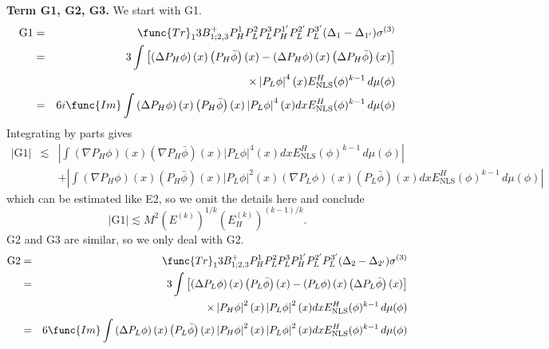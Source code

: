 \documentclass[12pt,letterpaper,leqno]{amsart}
\theoremstyle{plain}
\numberwithin{equation}{section}
\numberwithin{theorem}{section}
\numberwithin{proposition}{section}
\numberwithin{lemma}{section}
\numberwithin{corollary}{section}
\begin{document}
\textbf{Term G1, G2, G3. }We start with G1.%
\begin{eqnarray*}
\text{G1} &=&\func{Tr}%
_{1}3B_{1;2,3}^{+}P_{H}^{1}P_{L}^{2}P_{L}^{3}P_{H}^{1^{\prime
}}P_{L}^{2^{\prime }}P_{L}^{3^{\prime }}(\Delta _{1}-\Delta _{1^{\prime
}})\sigma ^{(3)} \\
&=&3\int \left[ \left( \Delta P_{H}\phi \right) (x)\left( P_{H}\bar{\phi}%
\right) (x)-\left( \Delta P_{H}\phi \right) (x)\left( \Delta P_{H}\bar{\phi}%
\right) (x)\right] \\
&&\times \left\vert P_{L}\phi \right\vert ^{4}(x)E_{\text{NLS}}^{H}(\phi
)^{k-1}\,d\mu (\phi ) \\
&=&6i\func{Im}\int \left( \Delta P_{H}\phi \right) (x)\left( P_{H}\bar{\phi}%
\right) (x)\left\vert P_{L}\phi \right\vert ^{4}(x)dxE_{\text{NLS}}^{H}(\phi
)^{k-1}\,d\mu (\phi )
\end{eqnarray*}%
Integrating by parts gives%
\begin{eqnarray*}
\left\vert \text{G1}\right\vert &\lesssim &\left\vert \int \left( \nabla
P_{H}\phi \right) (x)\left( \nabla P_{H}\bar{\phi}\right) (x)\left\vert
P_{L}\phi \right\vert ^{4}(x)dxE_{\text{NLS}}^{H}(\phi )^{k-1}\,d\mu (\phi
)\right\vert \\
&&+\left\vert \int \left( \nabla P_{H}\phi \right) (x)\left( P_{H}\bar{\phi}%
\right) (x)\left\vert P_{L}\phi \right\vert ^{2}(x)\left( \nabla P_{L}\phi
\right) (x)\left( P_{L}\bar{\phi}\right) (x)dxE_{\text{NLS}}^{H}(\phi
)^{k-1}\,d\mu (\phi )\right\vert
\end{eqnarray*}%
which can be estimated like E2, so we omit the details here and conclude%
\begin{equation*}
\left\vert \text{G1}\right\vert \lesssim
M^{2}(E^{(k)})^{1/k}(E_{H}^{(k)})^{(k-1)/k}.
\end{equation*}%
G2 and G3 are similar, so we only deal with G2.%
\begin{eqnarray*}
\text{G2} &=&\func{Tr}%
_{1}3B_{1;2,3}^{+}P_{H}^{1}P_{L}^{2}P_{L}^{3}P_{H}^{1^{\prime
}}P_{L}^{2^{\prime }}P_{L}^{3^{\prime }}(\Delta _{2}-\Delta _{2^{\prime
}})\sigma ^{(3)} \\
&=&3\int \left[ \left( \Delta P_{L}\phi \right) (x)\left( P_{L}\bar{\phi}%
\right) (x)-\left( P_{L}\phi \right) (x)\left( \Delta P_{L}\bar{\phi}\right)
(x)\right] \\
&&\times \left\vert P_{H}\phi \right\vert ^{2}(x)\left\vert P_{L}\phi
\right\vert ^{2}(x)dxE_{\text{NLS}}^{H}(\phi )^{k-1}\,d\mu (\phi ) \\
&=&6\func{Im}\int \left( \Delta P_{L}\phi \right) (x)\left( P_{L}\bar{\phi}%
\right) (x)\left\vert P_{H}\phi \right\vert ^{2}(x)\left\vert P_{L}\phi
\right\vert ^{2}(x)dxE_{\text{NLS}}^{H}(\phi )^{k-1}\,d\mu (\phi )
\end{eqnarray*}%
\end{document}
